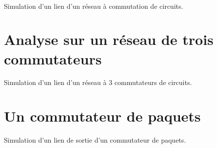         \paragraph{}
Simulation d'un lien d'un réseau à commutation de circuits.

    \clearpage
%
%
%
    \section{Analyse sur un réseau de trois commutateurs}
%
        \paragraph{}
Simulation d'un lien d'un réseau à 3 commutateurs de circuits.

    \clearpage
%
    \clearpage
%
%
%
    \section{Un commutateur de paquets}
%
        \paragraph{}
Simulation d'un lien de sortie d'un commutateur de paquets.

    \clearpage
%
    \clearpage
%
    \clearpage
%
